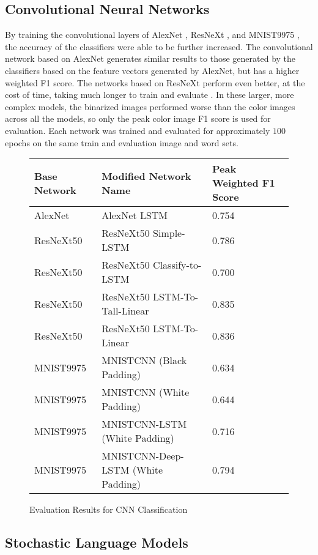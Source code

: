 \subsection{Convolutional Neural Networks}
By training the convolutional layers of AlexNet \cite{Krizhevsky}, ResNeXt \cite{Xie}, and MNIST9975 \cite{Deotte}, the accuracy of the classifiers were able to be further increased. The convolutional network based on AlexNet generates similar results to those generated by the classifiers based on the feature vectors generated by AlexNet, but has a higher weighted F1 score. The networks based on ResNeXt perform even better, at the cost of time, taking much longer to train and evaluate . In these larger, more complex models, the binarized images performed worse than the color images across all the models, so only the peak color image F1 score is used for evaluation. Each network was trained and evaluated for approximately $100$ epochs on the same train and evaluation image and word sets.

\begin{figure}[H]
    \caption{Evaluation Results for CNN Classification}
    \label{fig:classificationCNN}
    \centering
    \begin{tabular}{ | l | l | l | }
        \hline
        Base Network & Modified Network Name & Peak Weighted F1 Score \\
        \hline
        AlexNet & AlexNet LSTM & 0.754 \\
        ResNeXt50 & ResNeXt50 Simple-LSTM & 0.786 \\
        ResNeXt50 & ResNeXt50 Classify-to-LSTM & 0.700 \\
        ResNeXt50 & ResNeXt50 LSTM-To-Tall-Linear & 0.835 \\
        ResNeXt50 & ResNeXt50 LSTM-To-Linear & 0.836 \\
        MNIST9975 & MNISTCNN (Black Padding) & 0.634 \\
        MNIST9975 & MNISTCNN (White Padding) & 0.644 \\
        MNIST9975 & MNISTCNN-LSTM (White Padding) & 0.716 \\
        MNIST9975 & MNISTCNN-Deep-LSTM (White Padding) & 0.794 \\
        \hline
    \end{tabular}
\end{figure}

\subsection{Stochastic Language Models}

